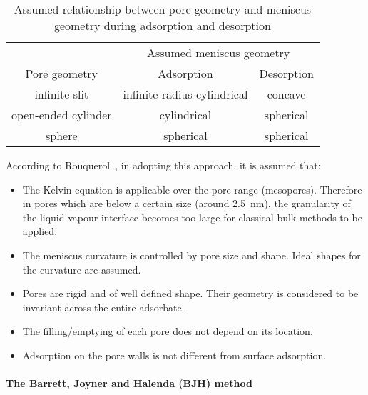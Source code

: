 \begin{table}[htb]
	\centering
	\caption{Assumed relationship between pore geometry and meniscus geometry during adsorption and desorption}%
	\label{pyg:tbl:kelvin-meniscus}
	\begin{tabular}{ccc}
		\toprule
		                    & \multicolumn{2}{c}{Assumed meniscus geometry}              \\
		\cmidrule{2-3}
		Pore geometry       & Adsorption                                    & Desorption \\
		\midrule
		infinite slit       & infinite radius cylindrical                   & concave    \\
		open-ended cylinder & cylindrical                                   & spherical  \\
		sphere              & spherical                                     & spherical  \\
		\bottomrule
	\end{tabular}
\end{table}

According to Rouquerol~\cite{rouquerolAdsorptionPowdersPorous2013},
in adopting this approach, it is assumed that:

\begin{itemize}

	\item The Kelvin equation is applicable over the pore
	      range (mesopores). Therefore in pores which are below a
	      certain size (around \SI{2.5}{\nano\meter}), the granularity
	      of the liquid-vapour interface becomes too large for classical
	      bulk methods to be applied.
	\item The meniscus curvature is controlled by pore size and
	      shape. Ideal shapes for the curvature are assumed.
	\item Pores are rigid and of well defined shape. Their geometry is
	      considered to be invariant across the entire adsorbate.
	\item The filling/emptying of each pore does not depend on its location.
	\item Adsorption on the pore walls is not different from
	      surface adsorption.

\end{itemize}

\paragraph{The Barrett, Joyner and Halenda (BJH) method}

